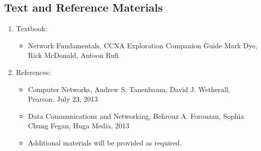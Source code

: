 \subsection{Text and Reference Materials}
\begin{enumerate}
	\item Textbook:
	\begin{itemize}
		\item Network Fundamentals, CCNA Exploration Companion Guide Mark Dye, Rick McDonald, Antoon Rufi
	\end{itemize}
	\item References:
	\begin{itemize}
		\item Computer Networks, Andrew S. Tanenbaum, David J. Wetherall, Pearson, July 23, 2013 
		\item Data Communications and Networking, Behrouz A. Forouzan, Sophia Chung Fegan, Huga Media, 2013
		\item Additional materials will be provided as required.
	\end{itemize}
\end{enumerate}